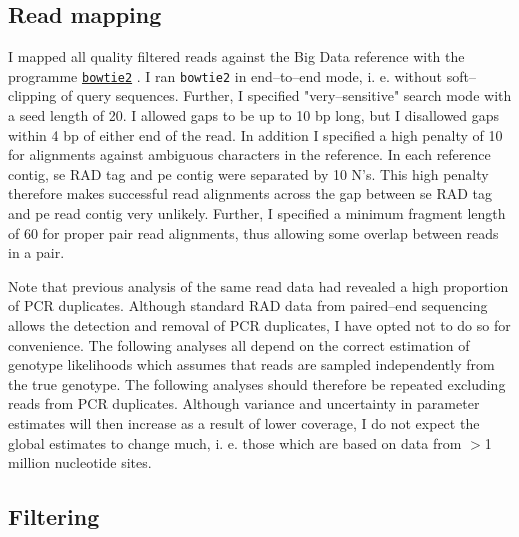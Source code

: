 \documentclass[a4paper,12pt,times,print,index,custombib,custommargin]{PhDThesisPSnPDF}\usepackage[]{graphicx}\usepackage[]{color}
\begin{document}
\subsection{Read mapping}
%
%
I mapped all quality filtered reads against the Big Data reference with the programme \href{http://bowtie-bio.sourceforge.net/bowtie2/manual.shtml}{\texttt{bowtie2}} \citep{Langmead2012}. I ran \texttt{bowtie2} in end--to--end mode, i. e. without soft--clipping of query sequences. Further, I specified "very--sensitive" search mode with a seed length of 20. I allowed gaps to be up to 10 bp long, but I disallowed gaps within 4 bp of either end of the read. In addition I specified a high penalty of 10 for alignments against ambiguous characters in the reference. In each reference contig, \gls{se} RAD tag and \gls{pe} contig were separated by 10 N's. This high penalty therefore makes successful read alignments across the gap between \gls{se} RAD tag and \gls{pe} read contig very unlikely. Further, I specified a minimum fragment length of 60 for \gls{proper pair} read alignments, thus allowing some overlap between reads in a pair. 

Note that previous analysis of the same read data had revealed a high proportion of PCR duplicates. Although standard RAD data from paired--end sequencing allows the detection and removal of PCR duplicates, I have opted not to do so for convenience. The following analyses all depend on the correct estimation of genotype likelihoods which assumes that reads are sampled independently from the true genotype. The following analyses should therefore be repeated excluding reads from PCR duplicates. Although variance and uncertainty in parameter estimates will then increase as a result of lower coverage, I do not expect the global estimates to change much, i. e. those which are based on data from $>$1 million nucleotide sites.

%
%
\subsection{Filtering}
%
%
\end{document}
